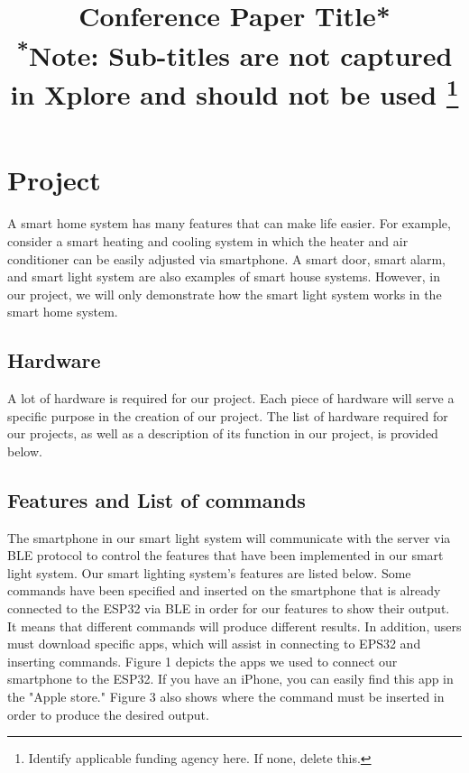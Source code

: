 \documentclass[conference]{IEEEtran}
\begin{document}
\title{Conference Paper Title*\\
{\footnotesize \textsuperscript{*}Note: Sub-titles are not captured in Xplore and
should not be used}
\thanks{Identify applicable funding agency here. If none, delete this.}
}

\author{





}

\maketitle





\section{Project}
A smart home system has many features that can make life easier. For example, consider a smart heating and cooling system in which the heater and air conditioner can be easily adjusted via smartphone. A smart door, smart alarm, and smart light system are also examples of smart house systems. However, in our project, we will only demonstrate how the smart light system works in the smart home system.


\subsection{Hardware}

A lot of hardware is required for our project. Each piece of hardware will serve a specific purpose in the creation of our project. The list of hardware required for our projects, as well as a description of its function in our project, is provided below.


\subsection{Features and List of commands}
The smartphone in our smart light system will communicate with the server via BLE protocol to control the features that have been implemented in our smart light system. Our smart lighting system's features are listed below. Some commands have been specified and inserted on the smartphone that is already connected to the ESP32 via BLE in order for our features to show their output. It means that different commands will produce different results. In addition, users must download specific apps, which will assist in connecting to EPS32 and inserting commands. Figure 1 depicts the apps we used to connect our smartphone to the ESP32. If you have an iPhone, you can easily find this app in the "Apple store." Figure 3 also shows where the command must be inserted in order to produce the desired output.
\end{document}
